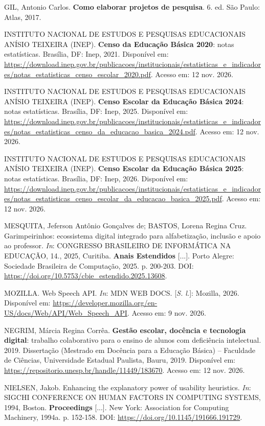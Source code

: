 \begin{referenciasIFTO}
GIL, Antonio Carlos. \textbf{Como elaborar projetos de pesquisa}. 6. ed. São Paulo: Atlas, 2017.

INSTITUTO NACIONAL DE ESTUDOS E PESQUISAS EDUCACIONAIS ANÍSIO TEIXEIRA (INEP). \textbf{Censo da Educação Básica 2020}: notas estatísticas. Brasília, DF: Inep, 2021. Disponível em: \url{https://download.inep.gov.br/publicacoes/institucionais/estatisticas_e_indicadores/notas_estatisticas_censo_escolar_2020.pdf}. Acesso em: 12 nov. 2026.

INSTITUTO NACIONAL DE ESTUDOS E PESQUISAS EDUCACIONAIS ANÍSIO TEIXEIRA (INEP). \textbf{Censo Escolar da Educação Básica 2024}: notas estatísticas. Brasília, DF: Inep, 2025. Disponível em: \url{https://download.inep.gov.br/publicacoes/institucionais/estatisticas_e_indicadores/notas_estatisticas_censo_da_educacao_basica_2024.pdf}. Acesso em: 12 nov. 2026.

INSTITUTO NACIONAL DE ESTUDOS E PESQUISAS EDUCACIONAIS ANÍSIO TEIXEIRA (INEP). \textbf{Censo Escolar da Educação Básica 2025}: notas estatísticas. Brasília, DF: Inep, 2026. Disponível em: \url{https://download.inep.gov.br/publicacoes/institucionais/estatisticas_e_indicadores/notas_estatisticas_censo_escolar_da_educacao_basica_2025.pdf}. Acesso em: 12 nov. 2026.

MESQUITA, Jeferson Antônio Gonçalves de; BASTOS, Lorena Regina Cruz. Garimpeirinhos: ecossistema digital integrado para alfabetização, inclusão e apoio ao professor. \textit{In}: CONGRESSO BRASILEIRO DE INFORMÁTICA NA EDUCAÇÃO, 14., 2025, Curitiba. \textbf{Anais Estendidos} [...]. Porto Alegre: Sociedade Brasileira de Computação, 2025. p. 200-203. DOI: \url{https://doi.org/10.5753/cbie_estendido.2025.13608}.

MOZILLA. Web Speech API. \textit{In}: MDN WEB DOCS. [\textit{S. l.}]: Mozilla, 2026. Disponível em: \url{https://developer.mozilla.org/en-US/docs/Web/API/Web_Speech_API}. Acesso em: 9 nov. 2026.

NEGRIM, Márcia Regina Corrêa. \textbf{Gestão escolar, docência e tecnologia digital}: trabalho colaborativo para o ensino de alunos com deficiência intelectual. 2019. Dissertação (Mestrado em Docência para a Educação Básica) – Faculdade de Ciências, Universidade Estadual Paulista, Bauru, 2019. Disponível em: \url{https://repositorio.unesp.br/handle/11449/183670}. Acesso em: 12 nov. 2026.

NIELSEN, Jakob. Enhancing the explanatory power of usability heuristics. \textit{In}: SIGCHI CONFERENCE ON HUMAN FACTORS IN COMPUTING SYSTEMS, 1994, Boston. \textbf{Proceedings} [...]. New York: Association for Computing Machinery, 1994a. p. 152-158. DOI: \url{https://doi.org/10.1145/191666.191729}.


\end{referenciasIFTO}
